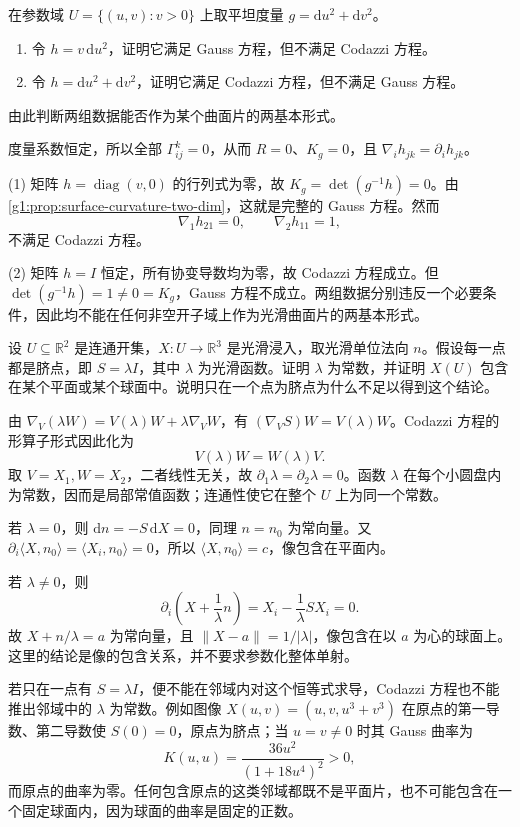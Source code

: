\begin{exercise}\label{g1:ex:gauss-codazzi-independent}
	在参数域 \(U=\{(u,v):v>0\}\) 上取平坦度量 \(g=\mathrm du^2+\mathrm dv^2\)。
	\begin{enumerate}
		\item 令 \(h=v\,\mathrm du^2\)，证明它满足 Gauss 方程，但不满足 Codazzi 方程。
		\item 令 \(h=\mathrm du^2+\mathrm dv^2\)，证明它满足 Codazzi 方程，但不满足 Gauss 方程。
	\end{enumerate}
	由此判断两组数据能否作为某个曲面片的两基本形式。
\end{exercise}
\begin{solution}
	度量系数恒定，所以全部 \(\Gamma^k_{ij}=0\)，从而 \(R=0\)、\(K_g=0\)，且 \(\nabla_i h_{jk}=\partial_i h_{jk}\)。

	(1) 矩阵 \(h=\operatorname{diag}(v,0)\) 的行列式为零，故 \(K_g=\det(g^{-1}h)=0\)。由\cref{g1:prop:surface-curvature-two-dim}，这就是完整的 Gauss 方程。然而
	\[
		\nabla_1h_{21}=0,\qquad \nabla_2h_{11}=1,
	\]
	不满足 Codazzi 方程。

	(2) 矩阵 \(h=I\) 恒定，所有协变导数均为零，故 Codazzi 方程成立。但 \(\det(g^{-1}h)=1\ne0=K_g\)，Gauss 方程不成立。两组数据分别违反一个必要条件，因此均不能在任何非空开子域上作为光滑曲面片的两基本形式。
\end{solution}

\begin{exercise}\label{g1:ex:totally-umbilic-surface}
	设 \(U\subseteq\mathbb R^2\) 是连通开集，\(X\colon U\rightarrow\mathbb R^3\) 是光滑浸入，取光滑单位法向 \(n\)。假设每一点都是脐点，即 \(S=\lambda I\)，其中 \(\lambda\) 为光滑函数。证明 \(\lambda\) 为常数，并证明 \(X(U)\) 包含在某个平面或某个球面中。说明只在一个点为脐点为什么不足以得到这个结论。
\end{exercise}
\begin{solution}
	由 \(\nabla_V(\lambda W)=V(\lambda)W+\lambda\nabla_VW\)，有 \((\nabla_VS)W=V(\lambda)W\)。Codazzi 方程的形算子形式因此化为
	\[
		V(\lambda)W=W(\lambda)V.
	\]
	取 \(V=X_1,W=X_2\)，二者线性无关，故 \(\partial_1\lambda=\partial_2\lambda=0\)。函数 \(\lambda\) 在每个小圆盘内为常数，因而是局部常值函数；连通性使它在整个 \(U\) 上为同一个常数。

	若 \(\lambda=0\)，则 \(\mathrm{d}n=-S\,\mathrm{d}X=0\)，同理 \(n=n_0\) 为常向量。又 \(\partial_i\langle X,n_0\rangle=\langle X_i,n_0\rangle=0\)，所以 \(\langle X,n_0\rangle=c\)，像包含在平面内。

	若 \(\lambda\ne0\)，则
	\[
		\partial_i\left(X+\frac1\lambda n\right)
		=X_i-\frac1\lambda S X_i=0.
	\]
	故 \(X+n/\lambda=a\) 为常向量，且 \(\lVert X-a\rVert=1/|\lambda|\)，像包含在以 \(a\) 为心的球面上。这里的结论是像的包含关系，并不要求参数化整体单射。

	若只在一点有 \(S=\lambda I\)，便不能在邻域内对这个恒等式求导，Codazzi 方程也不能推出邻域中的 \(\lambda\) 为常数。例如图像 \(X(u,v)=(u,v,u^3+v^3)\) 在原点的第一导数、第二导数使 \(S(0)=0\)，原点为脐点；当 \(u=v\ne0\) 时其 Gauss 曲率为
	\[
		K(u,u)=\frac{36u^2}{(1+18u^4)^2}>0,
	\]
	而原点的曲率为零。任何包含原点的这类邻域都既不是平面片，也不可能包含在一个固定球面内，因为球面的曲率是固定的正数。
\end{solution}

